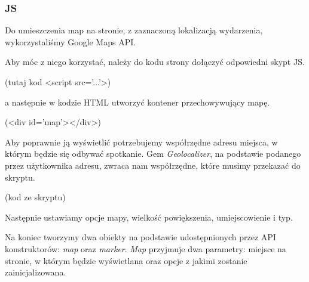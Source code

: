      \subsubsection{JS}
      Do umieszczenia map na stronie, z zaznaczoną lokalizacją wydarzenia, wykorzystaliśmy Google Maps API.

      Aby móc z niego korzystać, należy do kodu strony dołączyć odpowiedni skypt JS.

      \begin{center}
      (tutaj kod <script src='...'>)
      \end{center}

      a następnie w kodzie HTML utworzyć kontener przechowywujący mapę.

      \begin{center}
      (<div id='map'></div>)
      \end{center}

      Aby poprawnie ją wyświetlić potrzebujemy współrzędne adresu miejsca, w którym będzie się odbywać spotkanie. Gem \emph{Geolocalizer}, na podstawie podanego przez użytkownika adresu, zwraca nam współrzędne, które musimy przekazać do skryptu.

      \begin{center}
      (kod ze skryptu)
      \end{center}

      Następnie ustawiamy opcje mapy, wielkość powiększenia, umiejscowienie i typ.

      Na koniec tworzymy dwa obiekty na podstawie udostępnionych przez API konstruktorów: \emph{map} oraz \emph{marker}. \emph{Map} przyjmuje dwa parametry: miejsce na stronie, w którym będzie wyświetlana oraz opcje z jakimi zostanie zainicjalizowana.


